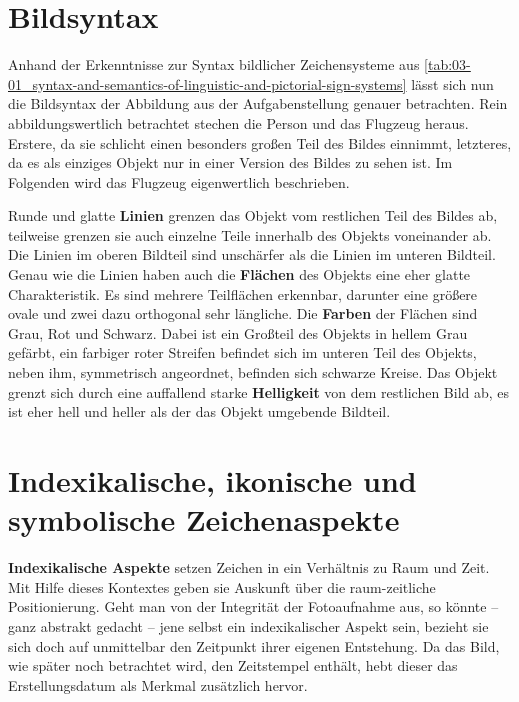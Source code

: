 \section{Bildsyntax}
\label{sec:03-03_picture-syntax}

Anhand der Erkenntnisse zur Syntax bildlicher Zeichensysteme aus \autoref{tab:03-01_syntax-and-semantics-of-linguistic-and-pictorial-sign-systems} lässt sich nun die Bildsyntax der Abbildung aus der Aufgabenstellung genauer betrachten. Rein abbildungswertlich betrachtet stechen die Person und das Flugzeug heraus. Erstere, da sie schlicht einen besonders großen Teil des Bildes einnimmt, letzteres, da es als einziges Objekt nur in einer Version des Bildes zu sehen ist. Im Folgenden wird das Flugzeug eigenwertlich beschrieben.

Runde und glatte \textbf{Linien} grenzen das Objekt vom restlichen Teil des Bildes ab, teilweise grenzen sie auch einzelne Teile innerhalb des Objekts voneinander ab. Die Linien im oberen Bildteil sind unschärfer als die Linien im unteren Bildteil. Genau wie die Linien haben auch die \textbf{Flächen} des Objekts eine eher glatte Charakteristik. Es sind mehrere Teilflächen erkennbar, darunter eine größere ovale und zwei dazu orthogonal sehr längliche. Die \textbf{Farben} der Flächen sind Grau, Rot und Schwarz. Dabei ist ein Großteil des Objekts in hellem Grau gefärbt, ein farbiger roter Streifen befindet sich im unteren Teil des Objekts, neben ihm, symmetrisch angeordnet, befinden sich schwarze Kreise. Das Objekt grenzt sich durch eine auffallend starke \textbf{Helligkeit} von dem restlichen Bild ab, es ist eher hell und heller als der das Objekt umgebende Bildteil.

\section{Indexikalische, ikonische und symbolische Zeichenaspekte}
\label{sec:03-04_indexical-iconic-and-symbolic-aspects-of-signs}

\textbf{Indexikalische Aspekte} setzen Zeichen in ein Verhältnis zu Raum und Zeit. Mit Hilfe dieses Kontextes geben sie Auskunft über die raum-zeitliche Positionierung. \cite[S. 11 f.]{001_MKO02_media-as-means-of-communication} Geht man von der Integrität der Fotoaufnahme aus, so könnte -- ganz abstrakt gedacht -- jene selbst ein indexikalischer Aspekt sein, bezieht sie sich doch auf unmittelbar den Zeitpunkt ihrer eigenen Entstehung. Da das Bild, wie später noch betrachtet wird, den Zeitstempel  enthält, hebt dieser das Erstellungsdatum als Merkmal zusätzlich hervor.

